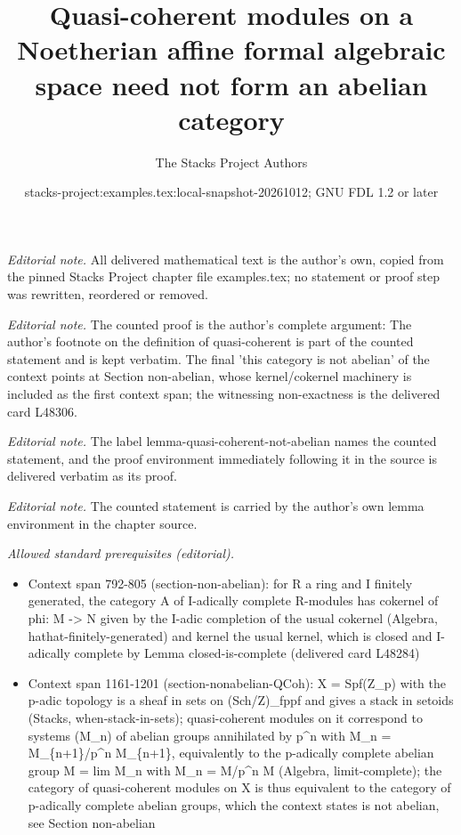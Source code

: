 \documentclass[10pt,a4paper]{amsart}
\title{Quasi-coherent modules on a Noetherian affine formal algebraic space need not form an abelian category}
\author{The Stacks Project Authors}
\date{stacks-project:examples.tex:local-snapshot-20261012; GNU FDL 1.2 or later}
\theoremstyle{plain}
\theoremstyle{definition}
\theoremstyle{remark}
\numberwithin{equation}{subsection}
\begin{document}
\maketitle
\noindent\textit{Editorial note.} All delivered mathematical text is the author's own, copied from the pinned Stacks Project chapter file examples.tex; no statement or proof step was rewritten, reordered or removed.\par\medskip
\noindent\textit{Editorial note.} The counted proof is the author's complete argument: The author's footnote on the definition of quasi-coherent is part of the counted statement and is kept verbatim. The final 'this category is not abelian' of the context points at Section non-abelian, whose kernel/cokernel machinery is included as the first context span; the witnessing non-exactness is the delivered card L48306.\par\medskip
\noindent\textit{Editorial note.} The label lemma-quasi-coherent-not-abelian names the counted statement, and the proof environment immediately following it in the source is delivered verbatim as its proof.\par\medskip
\noindent\textit{Editorial note.} The counted statement is carried by the author's own lemma environment in the chapter source.\par\medskip
\noindent\textit{Allowed standard prerequisites (editorial).}\begin{itemize}
\item Context span 792-805 (section-non-abelian): for R a ring and I finitely generated, the category A of I-adically complete R-modules has cokernel of phi: M -> N given by the I-adic completion of the usual cokernel (Algebra, hathat-finitely-generated) and kernel the usual kernel, which is closed and I-adically complete by Lemma closed-is-complete (delivered card L48284)
\item Context span 1161-1201 (section-nonabelian-QCoh): X = Spf(Z\_p) with the p-adic topology is a sheaf in sets on (Sch/Z)\_fppf and gives a stack in setoids (Stacks, when-stack-in-sets); quasi-coherent modules on it correspond to systems (M\_n) of abelian groups annihilated by p\textasciicircum{}n with M\_n = M\_\{n+1\}/p\textasciicircum{}n M\_\{n+1\}, equivalently to the p-adically complete abelian group M = lim M\_n with M\_n = M/p\textasciicircum{}n M (Algebra, limit-complete); the category of quasi-coherent modules on X is thus equivalent to the category of p-adically complete abelian groups, which the context states is not abelian, see Section non-abelian
\end{itemize}\medskip
\end{document}
